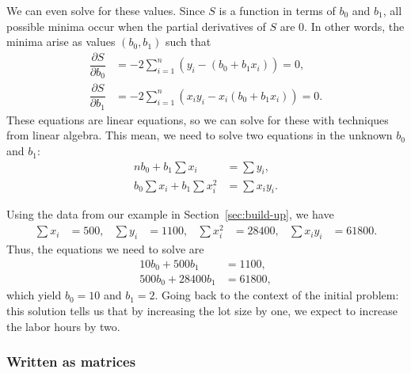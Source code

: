 \documentclass[a4paper, 12pt]{article}
\numberwithin{equation}{section}
\numberwithin{figure}{section}
\theoremstyle{definition}
\begin{document}
We can even solve for these values. Since $S$ is a function in terms of $b_0$
and $b_1$, all possible minima occur when the partial derivatives of $S$ are
$0$. In other words, the minima arise as values $(b_0,b_1)$ such that 
\begin{align*}
	\dfrac{\partial S}{\partial b_0} &= -2\sum_{i=1}^n \left(y_i - (b_0 + b_1x_i)\right) = 0, \\
	\dfrac{\partial S}{\partial b_1} &= -2\sum_{i=1}^n \left(x_iy_i - x_i(b_0 + b_1x_i)\right) = 0.
\end{align*}
These equations are linear equations, so we can solve for these with techniques
from linear algebra. This mean, we need to solve two equations in the unknown
$b_0$ and $b_1$:
\begin{equation}\label{eqn:least-squares-line}
	\begin{split}
		nb_0 + b_1\sum x_i &= \sum y_i, \\
		b_0 \sum x_i + b_1 \sum x_i^2 &= \sum x_iy_i. 
	\end{split}
\end{equation}

Using the data from our example in Section~\ref{sec:build-up}, we have 
\begin{align*}
	\sum x_i &= 500, & 
	\sum y_i &= 1100, & 
	\sum x_i^2 &= 28400, & 
	\sum x_iy_i &= 61800. 
\end{align*}
Thus, the equations we need to solve are 
\begin{align*}
	10b_0 + 500b_1 &= 1100, \\
	500b_0 + 28400b_1 &= 61800,
\end{align*}
which yield $b_0=10$ and $b_1 = 2$. Going back to the context of the initial
problem: this solution tells us that by increasing the lot size by one, we
expect to increase the labor hours by two. 

\subsubsection{Written as matrices}
\end{document}
